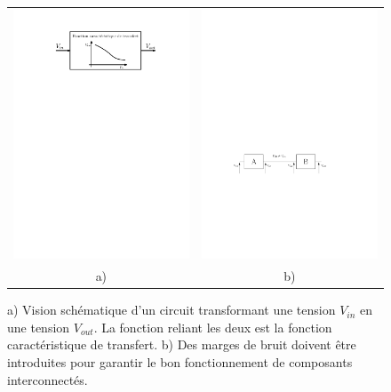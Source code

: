 \begin{figure}[htbp]
\centering\begin{tabular}{cc}
\includegraphics[width=0.5\linewidth]{Figs/vtc.pdf}& 
\includegraphics[width=0.5\linewidth]{Figs/VTC_connect.pdf}\\
a) & b)
\end{tabular}
\caption{\label{fig:VTC} a) Vision schématique d'un circuit transformant une tension $V_{in}$ en une tension $V_{out}$. La fonction reliant les deux est la fonction caractéristique de transfert. b) Des marges de bruit doivent être introduites pour garantir le bon fonctionnement de composants interconnectés. }
\end{figure}

